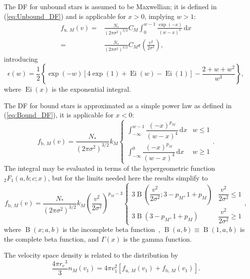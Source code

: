 \documentclass[useAMS,usedcolumn,usegraphicx,usenatbib]{mn2e}
\newcommand{\eqnref}[1]{(\ref{eq:#1})}
\DeclareMathOperator{\Ei}{Ei}
\DeclareMathOperator{\Beta}{B}
\newcommand{\sub}[1]{\ensuremath{_\mathrm{#1}}}
\newcommand{\dd}{\ensuremath{\mathrm{d}}}
\newcommand{\intd}[4]{\ensuremath{\displaystyle \int_{#1}^{#2}{#3}\,\dd{#4}}}
\newcommand{\recip}[1]{\ensuremath{\dfrac{1}{#1}}}
\begin{document}
\begin{onecolumn}
The DF for unbound stars is assumed to be Maxwellian; it is defined in \eqnref{Unbound_DF} and is applicable for $x > 0$, implying $w > 1$:
\begin{align}
f_{\mathrm{u},\,M}(v) = {} & \frac{N_\ast}{\left(2\pi\sigma^2\right)^{3/2}}C_M \intd{0}{w-1}{\frac{\exp(-x)}{(w-x)^4}}{x} \\
 = {} & \frac{N_\ast}{\left(2\pi\sigma^2\right)^{3/2}}C_M\epsilon\left(\frac{v^2}{2\sigma^2}\right),
\end{align}
introducing
\begin{equation}
\epsilon(w) = \recip{2}\left\{\exp(-w)\left[4\exp(1) + \Ei(w) - \Ei(1)\right] - \frac{2 + w + w^2}{w^3}\right\},
\end{equation}
where $\Ei(x)$ is the exponential integral.

The DF for bound stars is approximated as a simple power law as defined in \eqnref{Bound_DF}, it is applicable for $x < 0$:
\begin{equation}
f_{\mathrm{b},\,M}(v) = \frac{N_\ast}{\left(2\pi\sigma^2\right)^{3/2}}k_M\begin{cases}
\intd{-\infty}{w-1}{\dfrac{(-x)^{p_M}}{(w-x)^4}}{x} & w \leq 1 \\
\intd{-\infty}{0}{\dfrac{(-x)^{p_M}}{(w-x)^4}}{x} & w \geq 1
\end{cases}.
\end{equation}
The integral may be evaluated in terms of the hypergeometric function ${_2F_1(a,b;c;x)}$, but for the limits needed here the results simplify to
\begin{equation}
f_{\mathrm{b},\,M}(v) = \frac{N_\ast}{\left(2\pi\sigma^2\right)^{3/2}}k_M \left(\frac{v^2}{2\sigma^2}\right)^{p_M - 3}\begin{cases}
3 \Beta\left(\dfrac{v^2}{2\sigma^2}; 3 - p_M, 1 + p_M\right) & \dfrac{v^2}{2\sigma^2} \leq 1 \\
3 \Beta\left(3 - p_M, 1 + p_M\right) & \dfrac{v^2}{2\sigma^2} \geq 1
\end{cases},
\end{equation}
where $\Beta(x;a,b)$ is the incomplete beta function~\citep[8.17]{Olver2010}, $\Beta(a,b) \equiv \Beta(1,a,b)$ is the complete beta function, and $\Gamma(x)$ is the gamma function.

The velocity space density is related to the distribution by
\begin{equation}
\frac{4\pi r\sub{c}^3}{3}n_M(v_1) = 4\pi v_1^2\left[f_{\mathrm{u},\,M}(v_1) + f_{\mathrm{b},\,M}(v_1)\right].
\end{equation}


\end{onecolumn}
\end{document}
